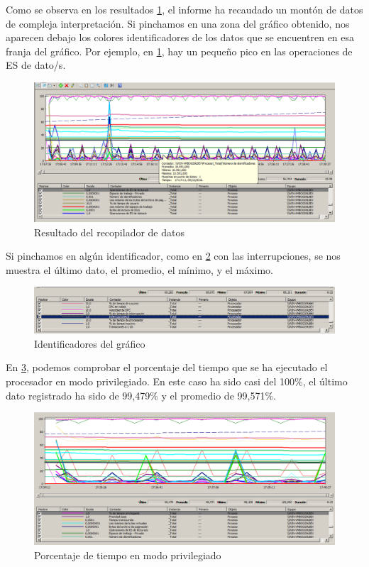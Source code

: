 Como se observa en los resultados \ref{cuestion5-resultado}, el informe ha recaudado un montón de datos de compleja interpretación.
Si pinchamos en una zona del gráfico obtenido, nos aparecen debajo los colores identificadores de los datos que se encuentren en esa franja del gráfico. Por ejemplo, en \ref{cuestion5-resultado}, hay un pequeño pico en las operaciones de ES de dato/s.

\begin{figure}[H]
	\centering
	\includegraphics[scale=0.35]{cuestion5-resultado.png}
	\caption{Resultado del recopilador de datos} \label{cuestion5-resultado}
\end{figure}

Si pinchamos en algún identificador, como en \ref{cuestion5-pinchar} con las interrupciones, se nos muestra el último dato, el promedio, el mínimo, y el máximo.

\begin{figure}[H]
	\centering
	\includegraphics[scale=0.35]{cuestion5-pinchar.png}
	\caption{Identificadores del gráfico} \label{cuestion5-pinchar}
\end{figure}

En \ref{cuestion5-porcentaje-privilegiado}, podemos comprobar el porcentaje del tiempo que se ha ejecutado el procesador en modo privilegiado. En este caso ha sido casi del 100\%, el último dato registrado ha sido de 99,479\% y el promedio de 99,571\%.

\begin{figure}[H]
	\centering
	\includegraphics[scale=0.35]{cuestion5-porcentaje-privilegiado.png}
	\caption{Porcentaje de tiempo en modo privilegiado} \label{cuestion5-porcentaje-privilegiado}
\end{figure}

